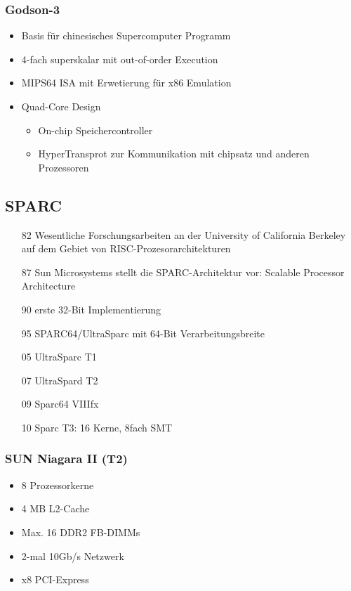 \subsubsection{Godson-3}
\begin{itemize}
	\item Basis für chinesisches Supercomputer Programm
	\item 4-fach superskalar mit out-of-order Execution
	\item MIPS64 ISA mit Erwetierung für x86 Emulation
	\item Quad-Core Design
	\begin{itemize}
		\item On-chip Speichercontroller
		\item HyperTransprot zur Kommunikation mit chipsatz und anderen Prozessoren
	\end{itemize}
\end{itemize}
\subsection{SPARC}
\begin{itemize}
	\item[82] Wesentliche Forschungsarbeiten an der University of California Berkeley auf dem Gebiet von RISC-Prozesorarchitekturen
	\item[87] Sun Microsystems stellt die SPARC-Architektur vor: Scalable Processor Architecture
	\item[90] erste 32-Bit Implementierung
	\item[95] SPARC64/UltraSparc mit 64-Bit Verarbeitungsbreite
	\item[05] UltraSparc T1
	\item[07] UltraSpard T2
	\item[09] Sparc64 VIIIfx
	\item[10] Sparc T3: 16 Kerne, 8fach SMT
\end{itemize}
\subsubsection{SUN Niagara II (T2)}
\begin{itemize}
	\item 8 Prozessorkerne
	\item 4 MB L2-Cache
	\item Max. 16 DDR2 FB-DIMMs
	\item 2-mal 10Gb/s Netzwerk
	\item x8 PCI-Express
\end{itemize}
